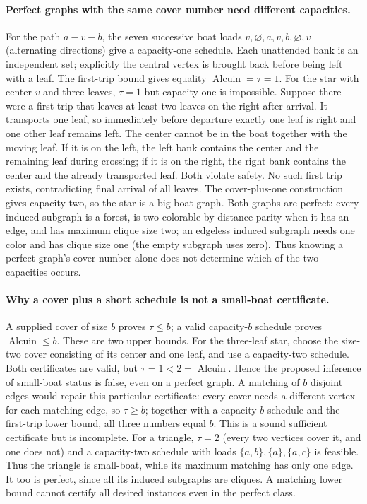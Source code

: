 \documentclass[11pt]{article}
\begin{document}
\paragraph{Perfect graphs with the same cover number need different capacities.}
For the path $a-v-b$, the seven successive boat loads
$v,\varnothing,a,v,b,\varnothing,v$ (alternating directions) give a
capacity-one schedule. Each unattended bank is an independent set; explicitly
the central vertex is brought back before being left with a leaf. The first-trip
bound gives equality $\operatorname{Alcuin}=\tau=1$.
For the star with center $v$ and three leaves, $\tau=1$ but capacity one
is impossible. Suppose there were a first trip that leaves at least two
leaves on the right after arrival. It transports one leaf, so immediately
before departure exactly one leaf is right and one other leaf remains left.
The center cannot be in the boat together with the moving leaf. If it is on
the left, the left bank contains the center and the remaining leaf during
crossing; if it is on the right, the right bank contains the center and the
already transported leaf. Both violate safety. No such first trip exists,
contradicting final arrival of all leaves. The cover-plus-one construction
gives capacity two, so the star is a big-boat graph.
Both graphs are perfect: every induced subgraph is a forest, is two-colorable
by distance parity when it has an edge, and has maximum clique size two;
an edgeless induced subgraph needs one color and has clique size one
(the empty subgraph uses zero). Thus knowing a perfect graph's cover number
alone does not determine which of the two capacities occurs.

\paragraph{Why a cover plus a short schedule is not a small-boat certificate.}
A supplied cover of size $b$ proves $\tau\le b$; a valid capacity-$b$
schedule proves $\operatorname{Alcuin}\le b$. These are two upper bounds.
For the three-leaf star, choose the size-two cover consisting of its center
and one leaf, and use a capacity-two schedule. Both certificates are valid,
but $\tau=1<2=\operatorname{Alcuin}$. Hence the proposed inference of
small-boat status is false, even on a perfect graph.
A matching of $b$ disjoint edges would repair this particular certificate:
every cover needs a different vertex for each matching edge, so
$\tau\ge b$; together with a capacity-$b$ schedule and the first-trip
lower bound, all three numbers equal $b$. This is a sound sufficient
certificate but is incomplete. For a triangle, $\tau=2$ (every two vertices
cover it, and one does not) and a capacity-two schedule with loads
$\{a,b\},\{a\},\{a,c\}$ is feasible. Thus the triangle is small-boat,
while its maximum matching has only one edge. It too is perfect, since all
its induced subgraphs are cliques. A matching lower bound cannot certify
all desired instances even in the perfect class.
\end{document}
